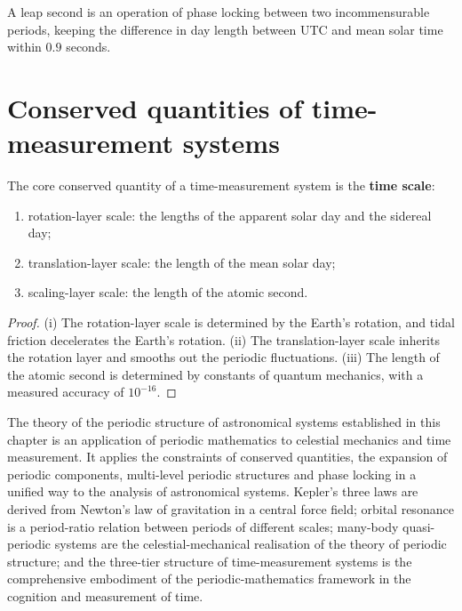 \begin{corollary}\label{cor:leap_second_periodic_alignment}
A leap second is an operation of phase locking between two incommensurable periods, keeping the difference in day length between UTC and mean solar time within \(0.9\) seconds.
\end{corollary}

\section{Conserved quantities of time-measurement systems}

\begin{proposition}\label{prop:time_scale_charge_conservation}
The core conserved quantity of a time-measurement system is the \textbf{time scale}:
\begin{enumerate}[label=(\roman*)]
    \item rotation-layer scale: the lengths of the apparent solar day and the sidereal day;
    \item translation-layer scale: the length of the mean solar day;
    \item scaling-layer scale: the length of the atomic second.
\end{enumerate}
\end{proposition}

\begin{proof}
(i) The rotation-layer scale is determined by the Earth's rotation, and tidal friction decelerates the Earth's rotation.
(ii) The translation-layer scale inherits the rotation layer and smooths out the periodic fluctuations.
(iii) The length of the atomic second is determined by constants of quantum mechanics, with a measured accuracy of \(10^{-16}\).
\end{proof}

\begin{remark}
The theory of the periodic structure of astronomical systems established in this chapter is an application of periodic mathematics to celestial mechanics and time measurement. It applies the constraints of conserved quantities, the expansion of periodic components, multi-level periodic structures and phase locking in a unified way to the analysis of astronomical systems. Kepler's three laws are derived from Newton's law of gravitation in a central force field; orbital resonance is a period-ratio relation between periods of different scales; many-body quasi-periodic systems are the celestial-mechanical realisation of the theory of periodic structure; and the three-tier structure of time-measurement systems is the comprehensive embodiment of the periodic-mathematics framework in the cognition and measurement of time.
\end{remark}

